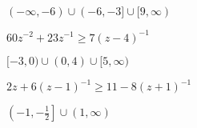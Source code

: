 \documentclass{ximera}
\begin{document}
\begin{problem}
\begin{question}
\begin{solution}
$(-\infty, -6) \cup (-6, -3] \cup [9, \infty)$

\end{solution}

\end{question}

\begin{question}
$60z^{-2}+23z^{-1} \geq 7(z-4)^{-1}$
\begin{solution}
$[-3,0) \cup (0,4) \cup [5, \infty)$
\end{solution}

\end{question}

\begin{question}
$2z+6(z-1)^{-1} \geq 11 - 8(z+1)^{-1}$ 

\begin{solution}
$\left(-1,-\frac{1}{2}\right] \cup (1, \infty)$

\end{solution}

\end{question}

\end{problem}
\end{document}
